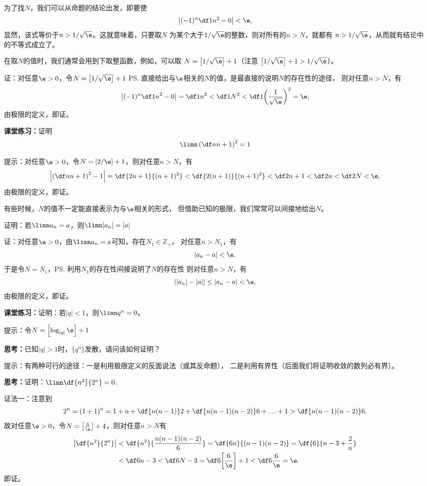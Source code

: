 为了找$N$，我们可以从命题的结论出发，即要使
$$\left|(-1)^n\df1{n^2}-0\right|<\e,$$
显然，该式等价于$n>1/{\sqrt{\e}}$。这就意味着，只要取$N$
为某个大于$1/\sqrt{\e}$的整数，则对所有的$n>N$，就都有
$n>1/\sqrt{\e}$，从而就有结论中的不等式成立了。

在取$N$的值时，我们通常会用到下取整函数，例如，可以取
$N=\left[1/\sqrt{\e}\right]+1$（注意
$\left[1/\sqrt{\e}\right]+1>1/\sqrt{\e}$）。

证：对任意$\e>0$，令$N=\left[1/\sqrt{\e}\right]+1$
\ps{直接给出与$\e$相关的$N$的值，是最直接的说明$N$的存在性的途径}，
则对任意$n>N$，有
$$\left|(-1)^n\df1{n^2}-0\right|=\df1{n^2}<\df1{N^2}
<\df1{\left(\frac1{\sqrt{\e}}\right)^2}=\e,$$
由极限的定义，即证。
\fin 

\bs
{\bf 课堂练习：}证明
$$\limn\left(\df n{n+1}\right)^2=1$$

\ifhint
提示：对任意$\e>0$，令$N=\left[2/\e\right]+1$，则对任意$n>N$，有
$$\left|\left(\df
n{n+1}\right)^2-1\right|=\df{2n+1}{(n+1)^2}<\df{2(n+1)}{(n+1)^2}
<\df2{n+1}<\df2n<\df2N<\e,$$
由极限的定义，即证。\fin
\fi

有些时候，$N$的值不一定能直接表示为与$\e$相关的形式，
但借助已知的极限，我们常常可以间接地给出$N$。

\bs
\egz 证明：若$\limn a_n=a$，则$\limn|a_n|=|a|$

证：对任意$\e>0$，由$\limn a_n=a$可知，存在$N_1\in\mathbb{Z}_+$，
对任意$n>N_1$，有
$$|a_n-a|<\e.$$
于是令$N=N_1$，\ps{利用$N_1$的存在性间接说明了$N$的存在性}
则对任意$n>N$，有
$$||a_n|-|a||\leq|a_n-a|<\e,$$
由极限的定义，即证。\fin 

\bs
{\bf 课堂练习：}证明：若$|q|<1$，则$\limn q^n=0$。

\ifhint
提示：令$N=\left[\log_{|q|}\e\right]+1$
\fi

\bs
{\bf 思考：}已知$|q|>1$时，$\{q^n\}$发散，请问该如何证明？

\ifhint 
提示：有两种可行的途径：一是利用极限定义的反面说法（或其反命题），
二是利用有界性（后面我们将证明收敛的数列必有界）。
\fi

\bs
{\bf 思考：}证明：$\limn\df{n^2}{2^n}=0$.

\ifhint
证法一：注意到
$$2^n=(1+1)^n=1+n+\df{n(n-1)}2+\df{n(n-1)(n-2)}6+\ldots+1
>\df{n(n-1)(n-2)}6.$$
故对任意$\e>0$，令$N=\left[\frac6{\e}\right]+4$，则对任意$n>N$有
\begin{align*}
	\left|\df{n^2}{2^n}\right|
	&<\df{n^2}{\frac{n(n-1)(n-2)}6}
	=\df{6n}{(n-1)(n-2)}=\df{6}{n-3+\frac2n}\\
	&<\df6{n-3}<\df6{N-3}=\df6{\left[\frac6{\e}\right]+1}
	<\df6{\frac{6}{\e}}=\e.
\end{align*}
即证。\fin

